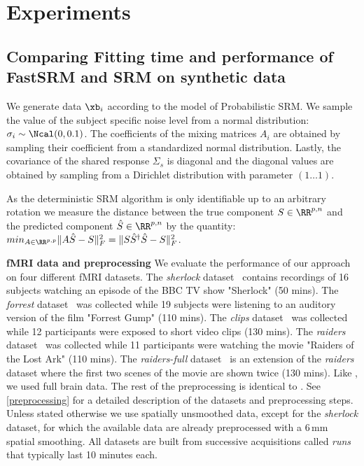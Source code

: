 \section{Experiments}
\subsection{Comparing Fitting time and performance of FastSRM and
  SRM on synthetic data}
We generate data $\xb_i$ according to the model of Probabilistic SRM. We sample the value of the subject specific noise level from a normal
distribution: $\sigma_i \sim \Ncal(0, 0.1)$. The coefficients of the mixing matrices $A_i$
are obtained by sampling their coefficient from a standardized normal distribution.
Lastly, the covariance of the shared response $\Sigma_s$ is diagonal and the
diagonal values are obtained by sampling from a Dirichlet distribution with
parameter $(1 \dots 1)$.

As the deterministic SRM algorithm is only identifiable up to an arbitrary
rotation we measure the distance between the true component $S \in \RR^{p, n}$ and
the predicted component $\hat{S} \in \RR^{p, n}$ by the quantity:
$min_{A \in \RR^{p, p}} \|A \hat{S} - S \|^2_F =  \|S \hat{S}^{\dagger}\hat{S} - S \|^2_F$.





\textbf{fMRI data and preprocessing} 
We evaluate the performance of our approach on four different fMRI datasets.
%
The \emph{sherlock} dataset~\cite{chen2017shared} contains recordings of 16 subjects watching an episode of the BBC TV show "Sherlock" (50 mins).
%
The \emph{forrest} dataset~\cite{hanke2014high} was collected while 19 subjects were listening to an auditory version of the film "Forrest Gump" (110 mins).
%
The \emph{clips} dataset~\cite{ibc} was collected while 12 participants were exposed to short video clips (130 mins).
%
The \emph{raiders} dataset~\cite{ibc} was collected while 11 participants were watching the movie "Raiders of the Lost Ark" (110 mins).
%
The \emph{raiders-full} dataset~\cite{ibc} is an extension of the \emph{raiders} dataset where the first two scenes of the movie are shown twice (130 mins).
%
Like \cite{zhang2016searchlight}, we used full brain data. The rest of the preprocessing is identical to \cite{chen2017shared}. See \ref{preprocessing} for a detailed description of the datasets and preprocessing steps. Unless stated otherwise we use spatially unsmoothed data, except for the \emph{sherlock} dataset, for which the available data are already preprocessed with a 6\,mm spatial smoothing. All datasets are built from successive acquisitions called \emph{runs} that typically last 10 minutes each.
%

